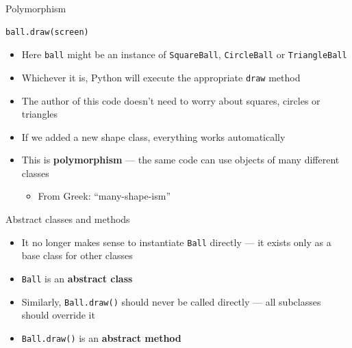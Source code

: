 \begin{frame}[fragile]{Polymorphism}
	\begin{lstlisting}
ball.draw(screen)
	\end{lstlisting}
	\begin{itemize}
		\pause\item Here \lstinline{ball} might be an instance of \lstinline{SquareBall}, \lstinline{CircleBall} or \lstinline{TriangleBall}
		\pause\item Whichever it is, Python will execute the appropriate \lstinline{draw} method
		\pause\item The author of this code doesn't need to worry about squares, circles or triangles
		\pause\item If we added a new shape class, everything works automatically
		\pause\item This is \textbf{polymorphism} --- the same code can use objects of many different classes
			\begin{itemize}
				\pause\item From Greek: ``many-shape-ism''
			\end{itemize}
	\end{itemize}
\end{frame}

\begin{frame}[fragile]{Abstract classes and methods}
	\begin{itemize}
		\pause\item It no longer makes sense to instantiate \lstinline{Ball} directly --- it exists only as a base class for other classes
		\pause\item \lstinline{Ball} is an \textbf{abstract class}
		\pause\item Similarly, \lstinline{Ball.draw()} should never be called directly --- all subclasses should override it
		\pause\item \lstinline{Ball.draw()} is an \textbf{abstract method}
	\end{itemize}
\end{frame}

